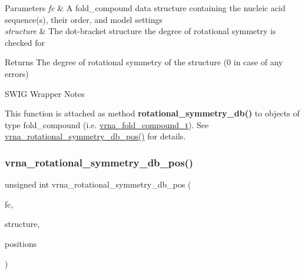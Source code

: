 \begin{DoxyParams}{Parameters}
{\em fc} & A fold\+\_\+compound data structure containing the nucleic acid sequence(s), their order, and model settings \\
\hline
{\em structure} & The dot-\/bracket structure the degree of rotational symmetry is checked for \\
\hline
\end{DoxyParams}
\begin{DoxyReturn}{Returns}
The degree of rotational symmetry of the {\ttfamily structure} (0 in case of any errors)
\end{DoxyReturn}
\begin{DoxyRefDesc}{S\+W\+I\+G Wrapper Notes}
\item[\hyperlink{wrappers__wrappers000008}{S\+W\+I\+G Wrapper Notes}]This function is attached as method {\bfseries rotational\+\_\+symmetry\+\_\+db()} to objects of type {\ttfamily fold\+\_\+compound} (i.\+e. \hyperlink{group__fold__compound_ga1b0cef17fd40466cef5968eaeeff6166}{vrna\+\_\+fold\+\_\+compound\+\_\+t}). See \hyperlink{group__combinatorics__utils_ga2a4227ebe28dbc7ad55444a3a1bf7119}{vrna\+\_\+rotational\+\_\+symmetry\+\_\+db\+\_\+pos()} for details. \end{DoxyRefDesc}
\mbox{\label{group__combinatorics__utils_ga2a4227ebe28dbc7ad55444a3a1bf7119}} 
\subsubsection{\texorpdfstring{vrna\+\_\+rotational\+\_\+symmetry\+\_\+db\+\_\+pos()}{vrna\_rotational\_symmetry\_db\_pos()}}
{\footnotesize\ttfamily unsigned int vrna\+\_\+rotational\+\_\+symmetry\+\_\+db\+\_\+pos (\begin{DoxyParamCaption}\item[{\hyperlink{group__fold__compound_ga1b0cef17fd40466cef5968eaeeff6166}{vrna\+\_\+fold\+\_\+compound\+\_\+t} $\ast$}]{fc,  }\item[{const char $\ast$}]{structure,  }\item[{unsigned int $\ast$$\ast$}]{positions }\end{DoxyParamCaption})}




